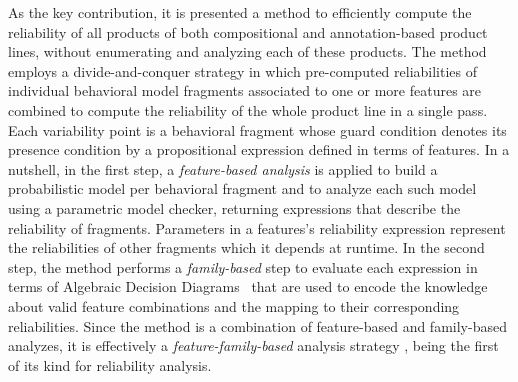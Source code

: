 As the key contribution, it is presented a method to efficiently compute the
reliability of all products of both compositional and annotation-based product
lines, without enumerating and analyzing each of these products. The method
employs a divide-and-conquer strategy in which pre-com\-put\-ed reliabilities of
individual behavioral model fragments associated to one or more features are
combined to compute the reliability of the whole product line in a single pass.
Each variability point is a behavioral fragment whose guard condition denotes
its presence condition by a propositional expression defined in terms of
features.  In a nutshell, in the first step, a \emph{feature-based analysis} is
applied to build a probabilistic model per behavioral fragment and to analyze
each such model using a parametric model checker, returning expressions that
describe the reliability of fragments. Parameters in a features's reliability
expression represent the reliabilities of other fragments which it depends at
runtime. In the second step, the method performs a \emph{family-based} step to
evaluate each expression in terms of Algebraic Decision
Diagrams~\cite{Bahar1997} that are used to encode the knowledge about valid
feature combinations and the mapping to their corresponding reliabilities. Since
the method is a combination of feature-based and family-based analyzes, it is
effectively a \emph{feature-family-based} analysis strategy
\cite{thum_classification_2014}, being the first of its kind for reliability
analysis.




